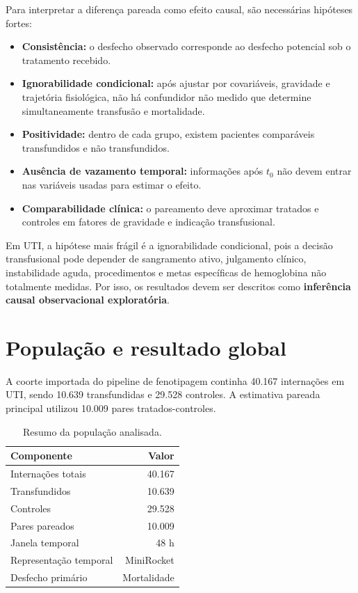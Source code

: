 Para interpretar a diferença pareada como efeito causal, são necessárias hipóteses fortes:

\begin{itemize}[leftmargin=1.5em, itemsep=0.25em]
  \item \textbf{Consistência:} o desfecho observado corresponde ao desfecho potencial sob o tratamento recebido.
  \item \textbf{Ignorabilidade condicional:} após ajustar por covariáveis, gravidade e trajetória fisiológica, não há confundidor não medido que determine simultaneamente transfusão e mortalidade.
  \item \textbf{Positividade:} dentro de cada grupo, existem pacientes comparáveis transfundidos e não transfundidos.
  \item \textbf{Ausência de vazamento temporal:} informações após $t_0$ não devem entrar nas variáveis usadas para estimar o efeito.
  \item \textbf{Comparabilidade clínica:} o pareamento deve aproximar tratados e controles em fatores de gravidade e indicação transfusional.
\end{itemize}

Em UTI, a hipótese mais frágil é a ignorabilidade condicional, pois a decisão transfusional pode depender de sangramento ativo, julgamento clínico, instabilidade aguda, procedimentos e metas específicas de hemoglobina não totalmente medidas. Por isso, os resultados devem ser descritos como \textbf{inferência causal observacional exploratória}.

\section{População e resultado global}

A coorte importada do pipeline de fenotipagem continha 40.167 internações em UTI, sendo 10.639 transfundidas e 29.528 controles. A estimativa pareada principal utilizou 10.009 pares tratados-controles.

\begin{table}[ht]
\centering
\caption{Resumo da população analisada.}
\begin{tabular}{lr}
\toprule
Componente & Valor \\
\midrule
Internações totais & 40.167 \\
Transfundidos & 10.639 \\
Controles & 29.528 \\
Pares pareados & 10.009 \\
Janela temporal & 48 h \\
Representação temporal & MiniRocket \\
Desfecho primário & Mortalidade \\
\bottomrule
\end{tabular}
\end{table}

